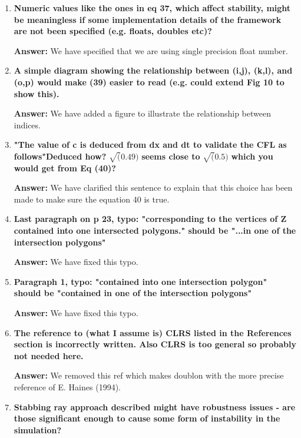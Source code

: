 \documentclass{article}
\newcommand{\answer}[1]{\textbf{\textcolor{answercolor}{Answer:}} \textcolor{answercolor}{#1}}
\begin{document}
\begin{enumerate}[label=\textbf{\arabic*.}]
    \answer{Indeed this formulation is more clear. We replace our piecewise definition with this one.}
        
    \item \textbf{Numeric values like the ones in eq 37, which affect stability, might be meaningless if some implementation details of the framework are not been specified (e.g. floats, doubles etc)?}
    
    \answer{We have specified that we are using single precision float number.}
        
    \item \textbf{A simple diagram showing the relationship between (i,j), (k,l), and (o,p) would make (39) easier to read (e.g. could extend Fig 10 to show this).}
    
    \answer{We have added a figure to illustrate the relationship between indices.}
        
    \item \textbf{"The value of c is deduced from dx and dt to validate the CFL as follows"Deduced how? }$\mathbf{\sqrt(0.49)}$\textbf{ seems close to }$\mathbf{\sqrt(0.5)}$\textbf{ which you would get from Eq (40)?}
    
    \answer{We have clarified this sentence to explain that this choice has been made to make sure the equation 40 is true.}

        
    \item \textbf{Last paragraph on p 23, typo: "corresponding to the vertices of Z contained into one intersected polygons." should be "...in one of the intersection polygons"}
    
    \answer{We have fixed this typo.}


        
    \item \textbf{Paragraph 1, typo: "contained into one intersection polygon" should be "contained in one of the intersection polygons"}
    
    \answer{We have fixed this typo.}
        

    \item \textbf{The reference to (what I assume is) CLRS listed in the References section is incorrectly written. Also CLRS is too general so probably not needed here.}
    
    \answer{We removed this ref which makes doublon with the more precise reference of E. Haines (1994).}

    \item \textbf{Stabbing ray approach described might have robustness issues - are those significant enough to cause some form of instability in the simulation?}
    

\end{enumerate}
\end{document}
